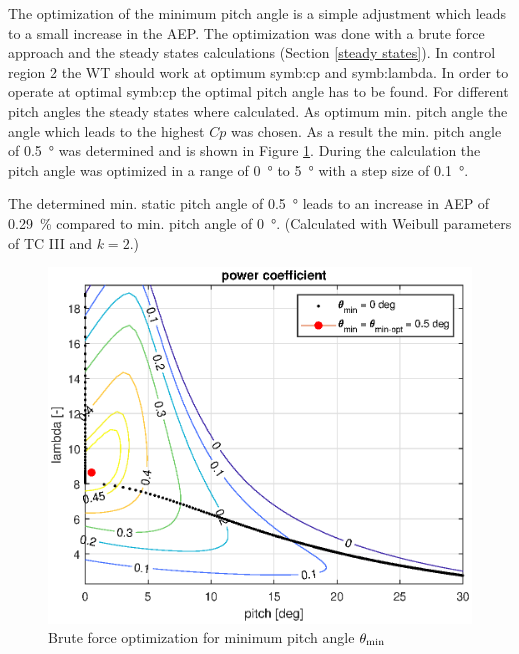 The optimization of the minimum pitch angle is a simple adjustment which leads to a small increase in the AEP. 
The optimization was done with a brute force approach and the steady states calculations (Section \ref{steady states}). 
In control region 2 the WT should work at optimum \gls{symb:cp} and \gls{symb:lambda}.
In order to operate at optimal \gls{symb:cp} the optimal pitch angle has to be found.
For different pitch angles the steady states where calculated. 
As optimum min. pitch angle the angle which leads to the highest $Cp$ was chosen. 
As a result the min. pitch angle of \SI{0.5}{\degree} was determined and is shown in Figure \ref{fig:theta min general}. 
During the calculation the pitch angle was optimized in a range of \SI{0}{\degree} to \SI{5}{\degree} with a step size of \SI{0.1}{\degree}.

The determined min. static pitch angle of \SI{0.5}{\degree} leads to an increase in AEP of \SI{0.29}{\%} compared to min. pitch angle of \SI{0}{\degree}. 
(Calculated with Weibull parameters of TC III and $k=2$.)

\begin{figure}[h]
	\centering	
	\includegraphics[width=12cm]{Figures/ThetaMinOpt}
	\caption{Brute force optimization for minimum pitch angle $\theta_\textnormal{min}$}
	\label{fig:theta min general}
\end{figure}
